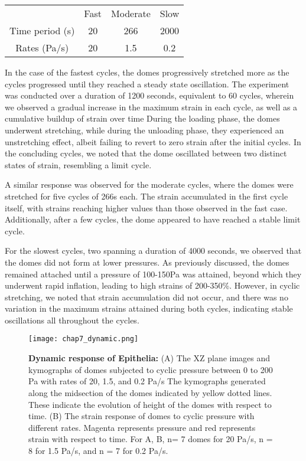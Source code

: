 \begin{center}
	\begin{table}[h!]
		\begin{tabular}{c c c c}
			& Fast & Moderate & Slow \\ 
			Time period (s) & 20   & 266      & 2000 \\ 
			Rates (Pa/s)    & 20   & 1.5      & 0.2  \\ 
		\end{tabular}
	\end{table}
\end{center}

In the case of the fastest cycles, the domes progressively stretched more as the cycles progressed until they reached a steady state oscillation. The experiment was conducted over a duration of 1200 seconds, equivalent to 60 cycles, wherein we observed a gradual increase in the maximum strain in each cycle, as well as a cumulative buildup of strain over time During the loading phase, the domes underwent stretching, while during the unloading phase, they experienced an unstretching effect, albeit failing to revert to zero strain after the initial cycles. In the concluding cycles, we noted that the dome oscillated between two distinct states of strain, resembling a limit cycle.

A similar response was observed for the moderate cycles, where the domes were stretched for five cycles of 266s each. The strain accumulated in the first cycle itself, with strains reaching higher values than those observed in the fast case. Additionally, after a few cycles, the dome appeared to have reached a stable limit cycle.

For the slowest cycles, two spanning a duration of 4000 seconds, we observed that the domes did not form at lower pressures. As previously discussed, the domes remained attached until a pressure of 100-150Pa was attained, beyond which they underwent rapid inflation, leading to high strains of 200-350\%. However, in cyclic stretching, we noted that strain accumulation did not occur, and there was no variation in the maximum strains attained during both cycles, indicating stable oscillations all throughout the cycles.

\begin{figure}[]
	\centering
	\texttt{[image: chap7\_dynamic.png]}
	\caption{\label{fig_7_6} \textbf{Dynamic response of Epithelia:} (A) The XZ plane images and kymographs of domes subjected to cyclic pressure between 0 to 200 Pa with rates of 20, 1.5, and 0.2 Pa/s The kymographs generated along the midsection of the domes indicated by yellow dotted lines. These indicate the evolution of height of the domes with respect to time. (B) The strain response of domes to cyclic pressure with different rates. Magenta represents pressure and red represents strain with respect to time. For A, B, n= 7 domes for 20 Pa/s, n = 8 for 1.5 Pa/s, and n = 7 for 0.2 Pa/s. 
	}
\end{figure}

